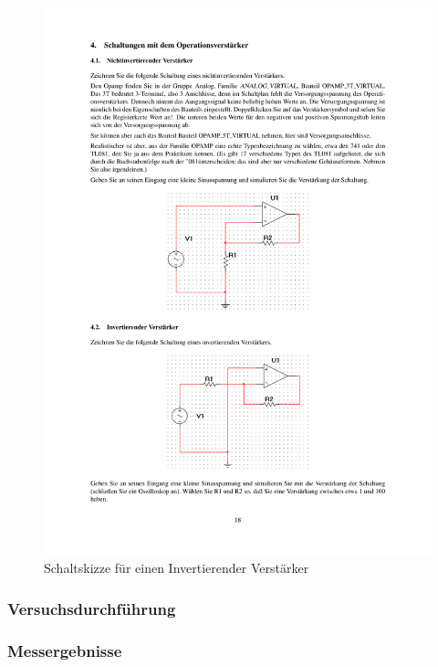 \documentclass[12pt,a4paper]{article}
\begin{document}
\begin{figure}[H] 
  \centering
    \includegraphics[trim = 10mm 130mm 10mm 100mm, clip, scale = 1]{ep5_14[Page18].pdf}
  	\caption[Schaltskizze für einen Invertierender Verstärker]{Schaltskizze für einen Invertierender Verstärker\footnotemark}
  \label{fig:1}
\end{figure}

\subsubsection{Versuchsdurchführung}

\subsubsection{Messergebnisse}
\end{document}
